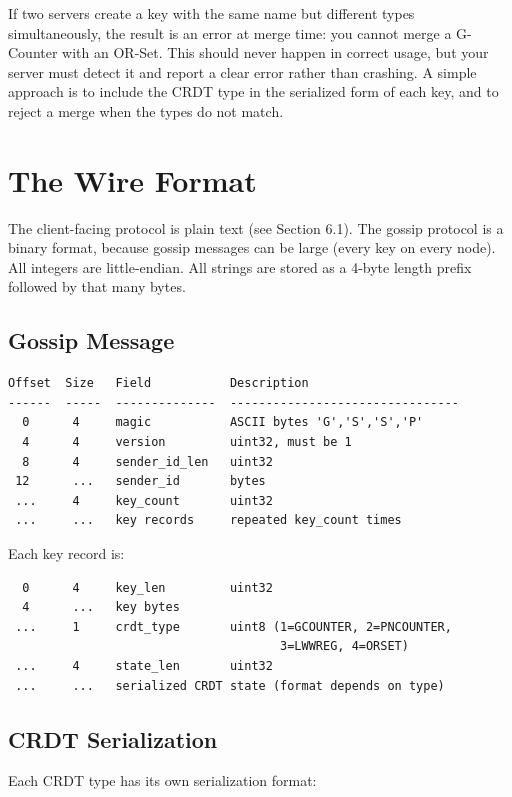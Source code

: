 \documentclass[11pt,a4paper]{article}
\begin{document}
If two servers create a key with the same name but different types simultaneously, the result is an error at merge time: you cannot merge a G-Counter with an OR-Set. This should never happen in correct usage, but your server must detect it and report a clear error rather than crashing. A simple approach is to include the CRDT type in the serialized form of each key, and to reject a merge when the types do not match.

\section{The Wire Format}

The client-facing protocol is plain text (see Section 6.1). The gossip protocol is a binary format, because gossip messages can be large (every key on every node). All integers are little-endian. All strings are stored as a 4-byte length prefix followed by that many bytes.

\subsection{Gossip Message}
\begin{codebox}
\begin{lstlisting}
Offset  Size   Field           Description
------  -----  --------------  --------------------------------
  0      4     magic           ASCII bytes 'G','S','S','P'
  4      4     version         uint32, must be 1
  8      4     sender_id_len   uint32
 12      ...   sender_id       bytes
 ...     4     key_count       uint32
 ...     ...   key records     repeated key_count times
\end{lstlisting}
\end{codebox}

Each key record is:

\begin{codebox}
\begin{lstlisting}
  0      4     key_len         uint32
  4      ...   key bytes
 ...     1     crdt_type       uint8 (1=GCOUNTER, 2=PNCOUNTER,
                                      3=LWWREG, 4=ORSET)
 ...     4     state_len       uint32
 ...     ...   serialized CRDT state (format depends on type)
\end{lstlisting}
\end{codebox}

\subsection{CRDT Serialization}
Each CRDT type has its own serialization format:
\end{document}
